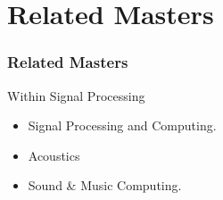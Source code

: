 \section{Related Masters}
\begin{frame}\frametitle{Related Masters}
    \begin{block}{Within Signal Processing} 
     \begin{itemize}
         \item Signal Processing and Computing.
         \item Acoustics
         \item Sound \& Music Computing.
     \end{itemize}
    \end{block}
\end{frame}

